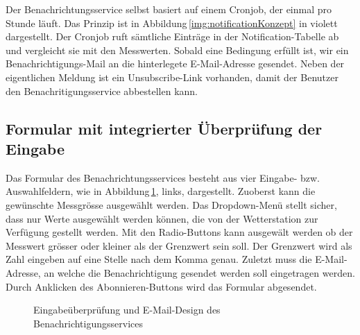 Der Benachrichtungsservice selbst basiert auf einem Cronjob, der einmal pro Stunde läuft. Das Prinzip ist in Abbildung\,\ref{img:notificationKonzept} in violett dargestellt. Der Cronjob ruft sämtliche Einträge in der Notification-Tabelle ab und vergleicht sie mit den Messwerten. Sobald eine Bedingung erfüllt ist, wir ein Benachrichtigungs-Mail an die hinterlegete E-Mail-Adresse gesendet. Neben der eigentlichen Meldung ist ein Unsubscribe-Link vorhanden, damit der Benutzer den Benachritigungsservice abbestellen kann.

\subsection{Formular mit integrierter Überprüfung der Eingabe}
Das Formular des Benachrichtungsservices besteht aus vier Eingabe- bzw. Auswahlfeldern, wie in Abbildung\,\ref{img:notificationFE}, links, dargestellt. Zuoberst kann die gewünschte Messgrösse ausgewählt werden. Das Dropdown-Menü stellt sicher, dass nur Werte ausgewählt werden können, die von der Wetterstation zur Verfügung gestellt werden. Mit den Radio-Buttons kann ausgewält werden ob der Messwert grösser oder kleiner als der Grenzwert sein soll. Der Grenzwert wird als Zahl eingeben auf eine Stelle nach dem Komma genau. Zuletzt muss die E-Mail-Adresse, an welche die Benachrichtigung gesendet werden soll eingetragen werden. Durch Anklicken des Abonnieren-Buttons wird das Formular abgesendet.

\begin{figure}[htbp!]
	\centering
	\caption{Eingabeüberprüfung und E-Mail-Design des Benachrichtigungsservices}
	\label{img:notificationFE}
\end{figure}

